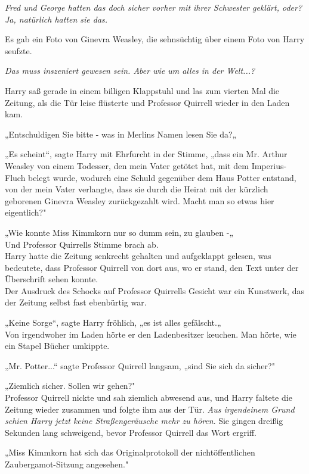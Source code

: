 {\emph{Fred und George hatten das doch sicher vorher mit ihrer Schwester geklärt, oder? Ja, natürlich hatten sie das.}

Es gab ein Foto von Ginevra Weasley, die sehnsüchtig über einem Foto von Harry seufzte.

\emph{Das muss inszeniert gewesen sein. Aber wie um alles in der Welt...?}

Harry saß gerade in einem billigen Klappstuhl und las zum vierten Mal die Zeitung, als die Tür leise flüsterte und Professor Quirrell wieder in den Laden kam.

„Entschuldigen Sie bitte - was in Merlins Namen lesen Sie da?„

„Es scheint“, sagte Harry mit Ehrfurcht in der Stimme, „dass ein Mr. Arthur Weasley von einem Todesser, den mein Vater getötet hat, mit dem Imperius-Fluch belegt wurde, wodurch eine Schuld gegenüber dem Haus Potter entstand, von der mein Vater verlangte, dass sie durch die Heirat mit der kürzlich geborenen Ginevra Weasley zurückgezahlt wird. Macht man so etwas hier eigentlich?"

„Wie konnte Miss Kimmkorn nur so dumm sein, zu glauben -„\\ Und Professor Quirrells Stimme brach ab.\\ Harry hatte die Zeitung senkrecht gehalten und aufgeklappt gelesen, was bedeutete, dass Professor Quirrell von dort aus, wo er stand, den Text unter der Überschrift sehen konnte.\\ Der Ausdruck des Schocks auf Professor Quirrells Gesicht war ein Kunstwerk, das der Zeitung selbst fast ebenbürtig war.

„Keine Sorge“, sagte Harry fröhlich, „es ist alles gefälscht.„\\ Von irgendwoher im Laden hörte er den Ladenbesitzer keuchen. Man hörte, wie ein Stapel Bücher umkippte.

„Mr. Potter...“ sagte Professor Quirrell langsam, „sind Sie sich da sicher?"

„Ziemlich sicher. Sollen wir gehen?"\\ Professor Quirrell nickte und sah ziemlich abwesend aus, und Harry faltete die Zeitung wieder zusammen und folgte ihm aus der Tür. \emph{Aus irgendeinem Grund schien Harry jetzt keine Straßengeräusche mehr zu hören}. Sie gingen dreißig Sekunden lang schweigend, bevor Professor Quirrell das Wort ergriff.

„Miss Kimmkorn hat sich das Originalprotokoll der nichtöffentlichen Zaubergamot-Sitzung angesehen."

}
